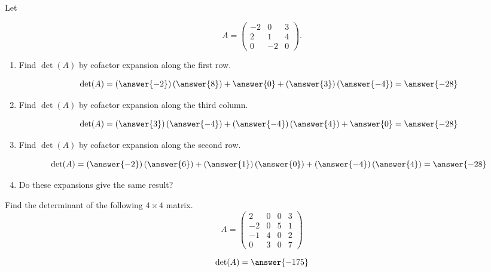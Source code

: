 \documentclass{ximera}
\begin{document}
\begin{exercise}

Let

\[A = \begin{pmatrix}
-2 & 0 & 3\\
2 & 1 & 4 \\
0 & -2 & 0
\end{pmatrix}.
\]

\begin{enumerate}
\item Find $\det(A)$ by cofactor expansion along the first row.

  \begin{prompt}
    \[
      \det(A) = \left(\answer{-2}\right)\left(\answer{8}\right) + \answer{0} + \left(\answer{3}\right)\left(\answer{-4}\right) = \answer{-28}
    \]
  \end{prompt}

\item Find $\det(A)$ by cofactor expansion along the third column.

  \begin{prompt}
    \[
      \det(A) = \left(\answer{3}\right)\left(\answer{-4}\right) + \left(\answer{-4}\right) \left(\answer{4}\right) + \answer{0} = \answer{-28}
    \]
  \end{prompt}

\item Find $\det(A)$ by cofactor expansion along the second row.

  \begin{prompt}
    \[
      \det(A) = \left(\answer{-2}\right)\left(\answer{6}\right) + \left(\answer{1}\right)\left(\answer{0}\right) + \left(\answer{-4}\right)\left(\answer{4}\right)= \answer{-28}
    \]
  \end{prompt}

\item Do these expansions give the same result?

  \begin{prompt}
    \begin{multipleChoice}
    \end{multipleChoice}
  \end{prompt}

\end{enumerate}

\end{exercise}
\begin{exercise}


Find the determinant of the following $4\times4$ matrix.
\[
A = \begin{pmatrix}
2 & 0 & 0 & 3\\
-2 & 0 & 5 & 1\\
-1 & 4 & 0 & 2\\
0 & 3 & 0 & 7
\end{pmatrix}
\]

\begin{prompt}
\[
  \det(A) = \answer{-175}
\]
\end{prompt}
\end{exercise}
\end{document}
